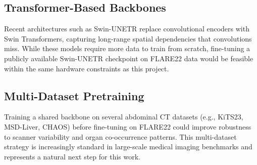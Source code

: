 \subsection{Transformer-Based Backbones}

Recent architectures such as Swin-UNETR replace convolutional encoders with Swin Transformers, capturing long-range spatial dependencies that convolutions miss. While these models require more data to train from scratch, fine-tuning a publicly available Swin-UNETR checkpoint on FLARE22 data would be feasible within the same hardware constraints as this project.

\subsection{Multi-Dataset Pretraining}

Training a shared backbone on several abdominal CT datasets (e.g., KiTS23, MSD-Liver, CHAOS) before fine-tuning on FLARE22 could improve robustness to scanner variability and organ co-occurrence patterns. This multi-dataset strategy is increasingly standard in large-scale medical imaging benchmarks and represents a natural next step for this work.